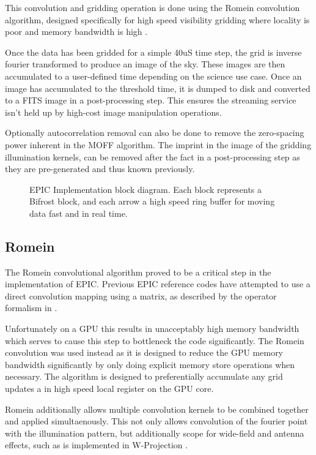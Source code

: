 \documentclass[bibliography=totocnumbered, twocolumn]{article}
\begin{document}
This convolution and gridding operation is done using the Romein
convolution algorithm, designed specifically for high speed
visibility gridding where locality is poor and memory bandwidth
is high \cite{romein_efficient_2012}.

Once the data has been gridded for a simple 40uS time step, the
grid is inverse fourier transformed to produce an image of the
sky. These images are then accumulated to a user-defined time
depending on the science use case. Once an image has accumulated
to the threshold time, it is dumped to disk and converted to a FITS
image in a post-processing step. This ensures the streaming service
isn't held up by high-cost image manipulation operations.

Optionally autocorrelation removal can also be done to remove
the zero-spacing power inherent in the MOFF algorithm. The
imprint in the image of the gridding illumination kernels, can be removed
after the fact in a post-processing step as they are
pre-generated and thus known previously.


\begin{figure}
  \centering
  \scalebox{0.5}{}
  \caption{EPIC Implementation block diagram. Each block represents a Bifrost block, and each arrow a high speed ring buffer for moving data fast and in real time.}
  \label{fig:pipeline}
\end{figure}

\subsection{Romein}

The Romein convolutional algorithm proved to be a critical
step in the implementation of EPIC. Previous EPIC reference codes
have attempted to use a direct convolution mapping using a matrix,
as described by the operator formalism in \cite{thyagarajan_generic_2017}.

Unfortunately on a GPU this results in unacceptably high
memory bandwidth which serves to cause this step to bottleneck
the code significantly. The Romein convolution was used instead as it
is designed to reduce the GPU memory bandwidth significantly
by only doing explicit memory store operations when necessary.
The algorithm is designed to preferentially accumulate any grid
updates a in high speed local register on the GPU core.

Romein additionally allows multiple convolution kernels to be
combined together and applied simultaenously. This not
only allows convolution of the fourier point with the
illumination pattern, but additionally scope for wide-field
and antenna effects, such as is implemented in W-Projection \cite{cornwell_noncoplanar_2008}.
\end{document}
